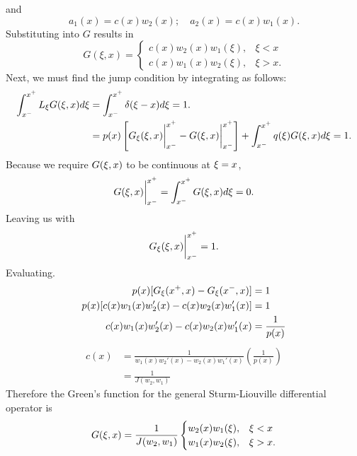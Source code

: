     and
    \begin{equation*}
        a_1(x)=c(x)w_2(x); \quad a_2(x)=c(x)w_1(x).
    \end{equation*}
    Substituting into \(G\) results in
    \begin{equation*}
        G(\xi,x)=\begin{cases}
            c(x)w_2(x)w_1(\xi), &\xi < x\\
            c(x)w_1(x)w_2(\xi), &\xi > x.
        \end{cases}
    \end{equation*}
    Next, we must find the jump condition by integrating as follows:
    \begin{equation*}
        \begin{split}
            \int_{x^-}^{x^+} L_\xi G(\xi,x) d\xi &= \int_{x^-}^{x^+} \delta(\xi-x)d\xi = 1.\\
            &=p(x)\left[G_\xi(\xi,x)\biggr\rvert_{x^-}^{x^+}-G(\xi,x)\biggr\rvert_{x^-}^{x^+}\right]+\int_{x^-}^{x^+}q(\xi)G(\xi,x)d\xi=1.
        \end{split}
    \end{equation*}
    Because we require \(G(\xi,x)\) to be continuous at \(\xi=x\), 
    \begin{equation*}
        G(\xi,x)\biggr\rvert_{x^-}^{x^+} = \int_{x^-}^{x^+}G(\xi,x)d\xi = 0.
    \end{equation*}
    Leaving us with
    \begin{equation*}
        G_\xi(\xi,x)\biggr\rvert_{x^-}^{x^+} = 1.
    \end{equation*}
    Evaluating.
    \begin{equation*}
        \begin{split}
            p(x)[G_\xi(x^+,x) - G_\xi(x^-,x)] &= 1\\
            p(x)[c(x)w_1(x)w_2'(x) - c(x)w_2(x)w_1'(x)] &=1\\
            c(x)w_1(x)w_2'(x) - c(x)w_2(x)w_1'(x) &=\frac{1}{p(x)}\\
        \end{split}
    \end{equation*}
    \begin{equation*}
        \begin{split}
            c(x) &= \frac{1}{w_1(x)w_2'(x) - w_2(x)w_1'(x)}\left(\frac{1}{p(x)} \right)\\
            &= \frac{1}{J(w_2,w_1)}
        \end{split}
    \end{equation*}
    Therefore the Green's function for the general Sturm-Liouville differential operator is 
    \begin{equation*}
        G(\xi,x) = \frac{1}{J(w_2,w_1)} \begin{cases}
            w_2(x)w_1(\xi), &\xi < x\\
            w_1(x)w_2(\xi), &\xi > x.
        \end{cases}
    \end{equation*}
